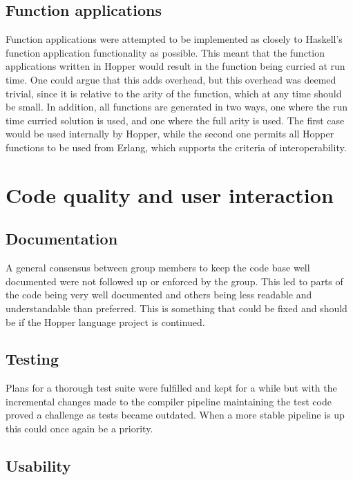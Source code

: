 \subsection{Function applications}

Function applications were attempted to be implemented as closely to Haskell's function application functionality as possible. This meant that the function applications written in Hopper would result in the function being curried at run time. One could argue that this adds overhead, but this overhead was deemed trivial, since it is relative to the arity of the function, which at any time should be small. In addition, all functions are generated in two ways, one where the run time curried solution is used, and one where the full arity is used. The first case would be used internally by Hopper, while the second one permits all Hopper functions to be used from Erlang, which supports  the criteria of interoperability.

\section{Code quality and user interaction}


\subsection{Documentation}

A general consensus between group members to keep the code base well documented were not followed up or enforced by the group. This led to parts of the code being very well documented and others being less readable and understandable than preferred. This is something that could be fixed and should be if the Hopper language project is continued.

\subsection{Testing}

Plans for a thorough test suite were fulfilled and kept for a while but with the incremental changes made to the compiler pipeline maintaining the test code proved a challenge as tests became outdated. When a more stable pipeline is up this could once again be a priority.

\subsection{Usability}

